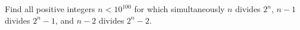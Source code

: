 Find all positive integers $n<10^{100}$ for which simultaneously $n$ divides $2^n$, $n-1$ divides $2^n-1$, and $n-2$ divides $2^n-2$.
